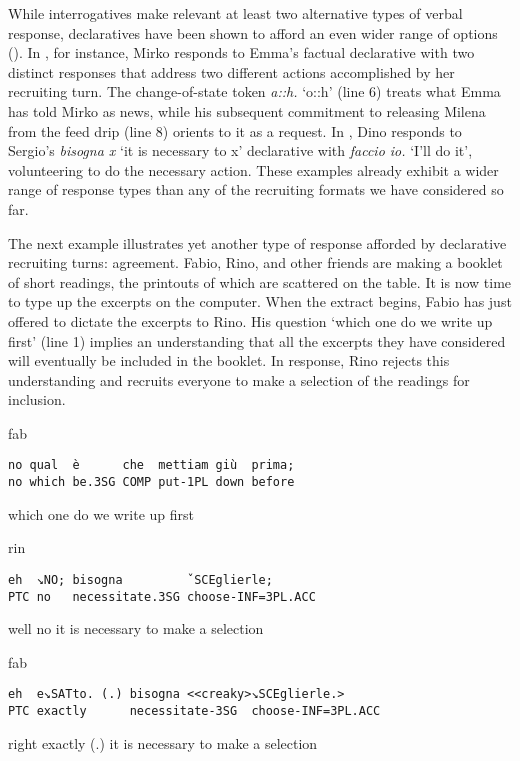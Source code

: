 \documentclass[output=paper,modfonts]{langscibook}
\begin{document}
While interrogatives make relevant at least two alternative types of verbal response, declaratives have been shown to afford an even wider range of options (\citealt{VinkhuyzenSzymanski2005,RossiZinken2016}). In , for instance, Mirko responds to Emma's factual declarative with two distinct responses that address two different actions accomplished by her recruiting turn. The change-of-state token \textit{a::h.} ‘o::h’ (line 6) treats what Emma has told Mirko as news, while his subsequent commitment to releasing Milena from the feed drip (line 8) orients to it as a request. In , Dino responds to Sergio's \textit{bisogna x} ‘it is necessary to x’ declarative with \textit{faccio io.} ‘I'll do it’, volunteering to do the necessary action. These examples already exhibit a wider range of response types than any of the recruiting formats we have considered so far.

The next example illustrates yet another type of response afforded by declarative recruiting turns: agreement. Fabio, Rino, and other friends are making a booklet of short readings, the printouts of which are scattered on the table. It is now time to type up the excerpts on the computer. When the extract begins, Fabio has just offered to dictate the excerpts to Rino. His question ‘which one do we write up first’ (line 1) implies an understanding that all the excerpts they have considered will eventually be included in the booklet. In response, Rino rejects this understanding and recruits everyone to make a selection of the readings for inclusion.

\vspace{2mm}
%
\begin{transbox}{1}{fab}
\begin{verbatim}
no qual  è      che  mettiam giù  prima;
no which be.3SG COMP put-1PL down before
\end{verbatim}
which one do we write up first
\end{transbox}\vspace{1mm}
%
\begin{mdframednoverticalspace}[style=firstfoc]
\begin{transbox}{2}{rin}
\begin{verbatim}
eh  ↘NO; bisogna         ˇSCEglierle;
PTC no   necessitate.3SG choose-INF=3PL.ACC
\end{verbatim}
well no it is necessary to make a selection
\end{transbox}
\end{mdframednoverticalspace}\vspace{1mm}
%
\begin{mdframednoverticalspace}[style=secondfoc]
\begin{transbox}{3}{fab}
\begin{verbatim}
eh  e↘SATto. (.) bisogna <<creaky>↘SCEglierle.>
PTC exactly      necessitate-3SG  choose-INF=3PL.ACC
\end{verbatim}
right exactly (.) it is necessary to make a selection
\end{transbox}
%
\end{mdframednoverticalspace}
\end{document}
